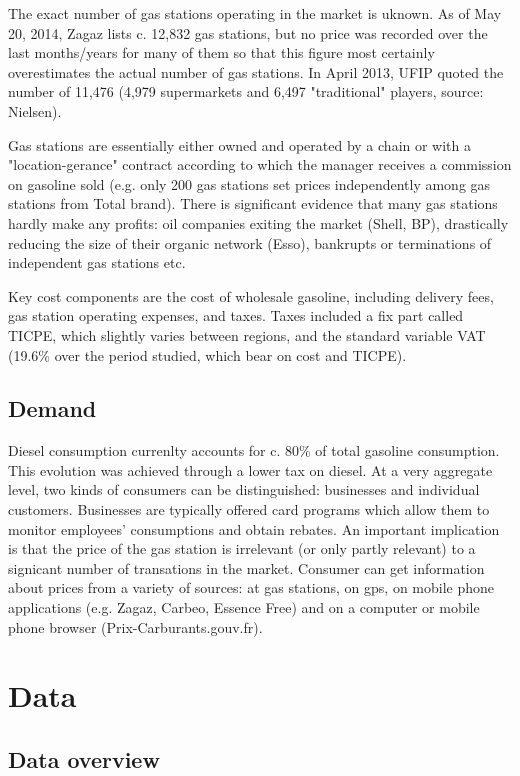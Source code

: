 \documentclass[11pt]{article}
\begin{document}
The exact number of gas stations operating in the market is uknown. As of May 20, 2014, Zagaz lists c. 12,832 gas stations, but no price was recorded over the last months/years for many of them so that this figure most certainly overestimates the actual number of gas stations. In April 2013, UFIP quoted the number of 11,476 (4,979 supermarkets and 6,497 "traditional" players, source: Nielsen).

Gas stations are essentially either owned and operated by a chain or with a "location-gerance" contract according to which the manager receives a commission on gasoline sold (e.g. only 200 gas stations set prices independently among gas stations from Total brand). There is significant evidence that many gas stations hardly make any profits: oil companies exiting the market (Shell, BP), drastically reducing the size of their organic network (Esso), bankrupts or terminations of independent gas stations etc.

Key cost components are the cost of wholesale gasoline, including delivery fees,  gas station operating expenses, and taxes. Taxes included a fix part called TICPE, which slightly varies between regions, and the standard variable VAT (19.6\% over the period studied, which bear on cost and TICPE).

\subsection{Demand}

Diesel consumption currenlty accounts for c. 80\% of total gasoline consumption. This evolution was achieved through a lower tax on diesel. At a very aggregate level, two kinds of consumers can be distinguished: businesses and individual customers. Businesses are typically offered card programs which allow them to monitor employees' consumptions and obtain rebates. An important implication is that the price of the gas station is irrelevant (or only partly relevant) to a signicant number of transations in the market.
Consumer can get information about prices from a variety of sources: at gas stations, on gps, on mobile phone applications (e.g. Zagaz, Carbeo, Essence Free) and on a computer or mobile phone browser (Prix-Carburants.gouv.fr).

\section{Data}

\subsection{Data overview}
\end{document}
